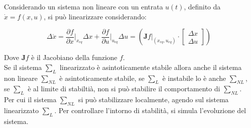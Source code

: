\documentclass{article}
\numberwithin{equation}{subsection}
\begin{document}
Considerando un sistema non lineare con un entrata $u(t)$, definito da $\dot x=f(x,u)$, si può linearizzare considerando: 

\begin{equation}
    \Delta\dot x=\displaystyle\frac{\partial f}{\partial x}\bigg|_{x_{eq}}\Delta x+\frac{\partial f}{\partial u}\bigg|_{u_{eq}}\Delta u=\left(\mathbf{J}f\bigg|_{(x_{eq},u_{eq})}\cdot
    \begin{bmatrix}
        \Delta x\\
        \Delta u
    \end{bmatrix}
    \right)
\end{equation}

Dove $\mathbf{J}f$ è il Jacobiano della funzione $f$. \\

Se il sistema $\sum_L$ linearizzato è asintoticamente stabile allora anche il sistema non lineare $\sum_{NL}$ è asintoticamente stabile, se $\sum_L$ è instabile lo è 
anche $\sum_{NL}$, se $\sum_L$ è al limite di stabiltià, non si può stabilire il comportamento di $\sum_{NL}$. Per cui il sistema $\sum_{NL}$ si può stabilizzare 
localmente, agendo sul sistema linearizzato $\sum_L$. Per controllare l'intorno di stabilità, si simula l'evoluzione del sistema. 

\begin{center}\end{center}

\clearpage
\end{document}
